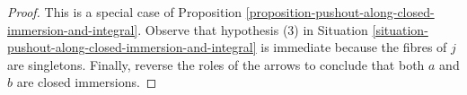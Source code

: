 \documentclass[10pt,a4paper]{amsart}
\theoremstyle{plain}
\theoremstyle{definition}
\theoremstyle{remark}
\numberwithin{equation}{subsection}
\begin{document}
\begin{proof}
This is a special case of
Proposition \ref{proposition-pushout-along-closed-immersion-and-integral}.
Observe that hypothesis (3) in
Situation \ref{situation-pushout-along-closed-immersion-and-integral}
is immediate because
the fibres of $j$ are singletons. Finally, reverse the roles of the arrows
to conclude that both $a$ and $b$ are closed immersions.
\end{proof}
\end{document}
